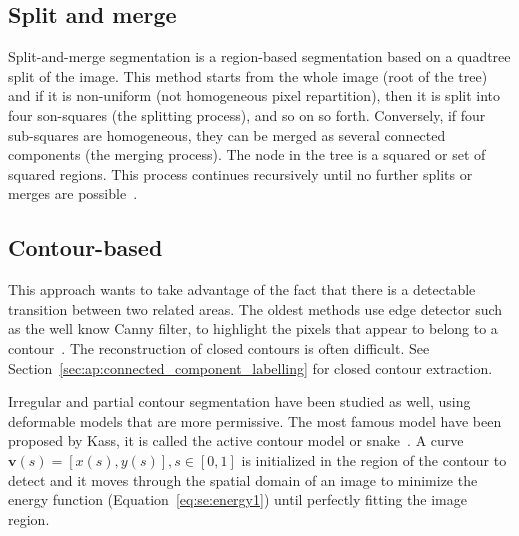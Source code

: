 
\subsection{Split and merge} %
\label{sub:split_and_merge}
Split-and-merge segmentation is a region-based segmentation based on a quadtree split of the image.
This method starts from the whole image (root of the tree) and if it is non-uniform (not homogeneous pixel repartition), then it is split into four son-squares (the splitting process), and so on so forth.
Conversely, if four sub-squares are homogeneous, they can be merged as several connected components (the merging process).
The node in the tree is a squared or set of squared regions.
This process continues recursively until no further splits or merges are possible~\cite{Kelkar2008Improved,horowitz1976picture}.


\subsection{Contour-based} %
\label{sub:ap:contour_based}
This approach wants to take advantage of the fact that there is a detectable transition between two related areas.
The oldest methods use edge detector such as the well know Canny filter, to highlight the pixels that appear to belong to a contour~\cite{canny1986computational}.
The reconstruction of closed contours is often difficult.
See Section~\ref{sec:ap:connected_component_labelling} for closed contour extraction.

Irregular and partial contour segmentation have been studied as well, using deformable models that are more permissive.
The most famous model have been proposed by Kass, it is called the active contour model or snake~\cite{Kass1988}.
A curve $\mathbf{v}(s)=[x(s),y(s)], s \in [0,1]$ is initialized in the region of the contour to detect and it moves through the spatial domain of an image to minimize the energy function (Equation~\ref{eq:se:energy1}) until perfectly fitting the image region.

